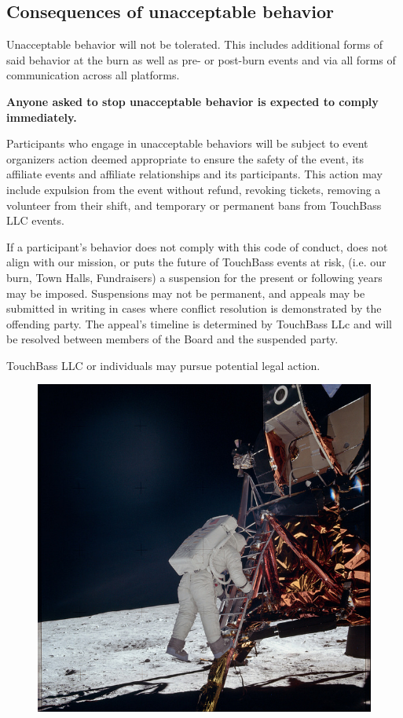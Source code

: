 \begin{multicols}{2}
\subsection*{Consequences of unacceptable behavior}
Unacceptable behavior will not be tolerated. This includes additional forms of said behavior at the burn as well as pre- or post-burn events and via all forms of communication across all platforms.

\textbf{Anyone asked to stop unacceptable behavior is expected to comply immediately.}

Participants who engage in unacceptable behaviors will be subject to event organizers action deemed appropriate to ensure the safety of the event, its affiliate events and affiliate relationships and its participants.
This action may include expulsion from the event without refund, revoking tickets, removing a volunteer from their shift, and temporary or permanent bans from TouchBass LLC events.

If a participant’s behavior does not comply with this code of conduct, does not align with our mission, or puts the future of TouchBass events at risk, (i.e. our burn, Town Halls, Fundraisers) a suspension for the present or following years may be imposed.
Suspensions may not be permanent, and appeals may be submitted in writing in cases where conflict resolution is demonstrated by the offending party. The appeal’s timeline is determined by TouchBass LLc and will be resolved between members of the Board and the suspended party.

TouchBass LLC or individuals may pursue potential legal action.
\end{multicols}

\vspace{2.75cm}

\begin{figure}[!h]
\centering
\includegraphics[width=.9\textwidth]{images/arrival.jpg}
\label{image:firststep}
\end{figure}

